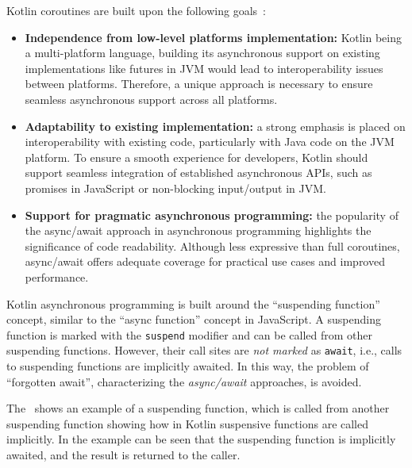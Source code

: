 Kotlin coroutines are built upon the following goals~\cite{elizarov2021kotlin}:
\begin{itemize}
	\item \textbf{Independence from low-level platforms implementation:} Kotlin being a multi-platform language, building its asynchronous support on
	      existing implementations like futures in JVM would lead to interoperability issues between platforms. Therefore, a unique approach is
	      necessary to ensure seamless asynchronous support across all platforms.
	\item \textbf{Adaptability to existing implementation:} a strong emphasis is placed on interoperability with existing code, particularly with
	      Java code on the JVM platform. To ensure a smooth experience for developers, Kotlin should support seamless integration of established
	      asynchronous APIs, such as promises in JavaScript or non-blocking input/output in JVM.
	\item \textbf{Support for pragmatic asynchronous programming:} the popularity of the async/await approach in asynchronous programming highlights
	      the significance of code readability. Although less expressive than full coroutines, async/await offers adequate coverage for practical use
	      cases and improved performance.
\end{itemize}



Kotlin asynchronous programming is built around the ``suspending function'' concept, similar to the ``async function'' concept in JavaScript.
A suspending function is marked with the \texttt{suspend} modifier and can be called from other suspending functions. However, their call sites
are \emph{not marked} as \texttt{await}, i.e., calls to suspending functions are implicitly awaited.
In this way, the problem of ``forgotten await'', characterizing the \emph{async/await} approaches, is avoided.

The~ shows an example of a suspending function, which is called from another suspending function showing how
in Kotlin suspensive functions are called implicitly.
In the example can be seen that the suspending function is implicitly awaited, and the result is returned to the caller.

